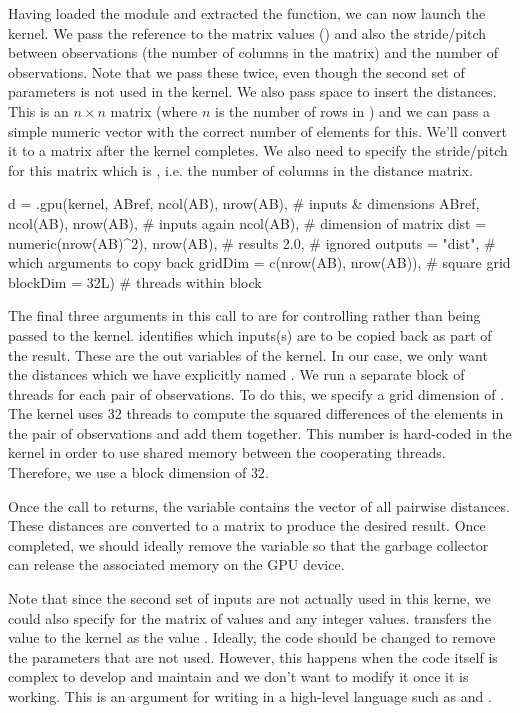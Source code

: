 Having loaded the module and extracted the function, 
we can now launch the kernel. We pass the reference
to the matrix values () and also
the stride/pitch between observations (the number of columns in 
the matrix) and the number of observations.
Note that we pass these twice, even though the second set of parameters is not
used in the kernel.
We also pass space to insert the distances. This is an $n \times n$
matrix  (where $n$ is the number of rows in )
and we can pass a simple numeric vector with the correct number of
elements for this.  We'll convert it to a matrix after the kernel
completes.
We also need to specify the stride/pitch for this matrix which is
, i.e. the number of columns in the distance matrix.
\begin{RCode}
d = .gpu(kernel,
         ABref, ncol(AB), nrow(AB),            # inputs & dimensions
         ABref, ncol(AB), nrow(AB),            # inputs again
         ncol(AB),                             # dimension of matrix
         dist = numeric(nrow(AB)^2), nrow(AB), # results
         2.0,                                  # ignored
         outputs = "dist",                # which arguments to copy back
         gridDim = c(nrow(AB), nrow(AB)), # square grid
         blockDim = 32L)                  # threads within block
\end{RCode}
The final three arguments in this call to  are for
controlling  rather than being passed to the kernel.
 identifies which inputs(s) are to be copied back as part
of the result. These are the out variables of the kernel.
In our case, we only want the distances which we have explicitly named
.
We run a separate block of threads for each pair of observations.
To do this, we specify a grid dimension of .
The kernel uses $32$ threads to compute the squared differences of the
elements in the pair of observations and add them together.
This number is hard-coded in the kernel in order to use shared memory
between the cooperating threads.
Therefore, we use a block dimension of $32$.

Once the call to  returns, the variable  contains
the vector of all pairwise distances.  These distances are converted
to a matrix to produce the desired result. Once completed, we should
ideally remove the variable  so that the garbage collector
can release the associated memory on the GPU device.

Note that since the second set of inputs are not actually used in
this kerne, we could also specify \Rnull{} for the matrix
of values and any integer values.   transfers the \R{}
value to the kernel as the \C{} value \Cnull.
Ideally, the code should be changed to remove the parameters that are
not used. However, this happens when the code itself is complex to
develop and maintain and we don't want to modify it once it is working.
This is an argument for writing in a high-level
language such as \R{} and .


